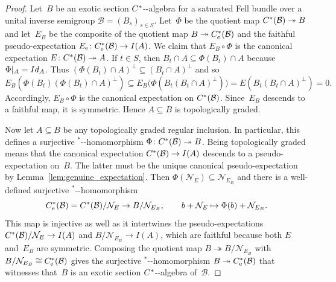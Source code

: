 \documentclass[10pt,a4paper]{amsart}
\providecommand{\nobreakdash}{\nobreak\hbox{-}}
\newcommand*{\B}{\mathcal B}%
\newcommand*{\Cst}{\textup C^*}%
\newcommand*{\Id}{\textup{Id}}%
\newcommand*{\Null}{\mathcal N}%
\newcommand*{\Star}{\(^*\)\nobreakdash-}
\newcommand*{\ess}{\mathrm{e}}%
\newcommand*{\nb}{\nobreakdash}
\newcommand*{\onto}{\twoheadrightarrow}
\begin{document}
\begin{proof}
  Let~\(B\) be an exotic section \(\Cst\)\nb-algebra for a saturated
  Fell bundle over a unital inverse semigroup \(\B=(B_{s})_{s\in S}\).
  Let~\(\Phi\) be the quotient map \(\Cst(\B) \onto B\) and
  let~\(E_B\) be the composite of the quotient map \(B\onto
  \Cst_\ess(\B)\) and the faithful pseudo-expectation \(E_\ess\colon
  \Cst_\ess(\B)\to I(A)\).
  We claim that \(E_B\circ \Phi\) is the canonical expectation
  \(E\colon \Cst(\B)\onto A\).
  If \(t\in S\), then \(B_t\cap A\subseteq \Phi(B_t)\cap A\) because
  \(\Phi|_A=\Id_A\).
  Thus \((\Phi(B_t)\cap A)^\bot \subseteq (B_t\cap A)^\bot\) and so
  \[
    E_B(\Phi(B_t)(\Phi(B_t)\cap A)^\bot)
    \subseteq E_B\bigl(\Phi(B_t(B_t\cap A)^\bot)\bigr)
    = E(B_t(B_t\cap A)^\bot)=0.
  \]
  Accordingly, \(E_B\circ\Phi\) is the canonical expectation on
  \(\Cst(\B)\).
  Since~\(E_B\) descends to a faithful map, it is symmetric.
  Hence \(A\subseteq B\) is topologically graded.

  Now let \(A\subseteq B\) be any topologically graded regular
  inclusion.
  In particular, this defines a surjective \Star{}homomorphism
  \(\Phi\colon\Cst(\B) \onto B\).
  Being topologically graded means that the canonical expectation
  \(\Cst(\B)\to I(A)\) descends to a pseudo-expectation on~\(B\).
  The latter must be the unique canonical pseudo-expectation by
  Lemma~\ref{lem:genuine_expectation}.
  Then \(\Phi(\Null_E)\subseteq \Null_{E_B}\) and there is a
  well-defined surjective \Star{}homomorphism
  \[
    \Cst_\ess(\B)= \Cst(\B)/\Null_E \to B/\Null_{E_B},
    \qquad
    b+\Null_E\mapsto \Phi(b)+\Null_{E_B}.
  \]
  This map is injective as well as it intertwines the
  pseudo-expectations \(\Cst(\B)/\Null_E\to I(A)\) and
  \(B/\Null_{E_B}\to I(A)\), which are faithful because both  \(E\)
  and~\(E_B\) are symmetric.
  Composing the quotient map \(B\onto B/\Null_{E_B}\) with
  \(B/\Null_{E_B}\cong \Cst_\ess(\B)\) gives the surjective
  \Star{}homomorphism \(B\onto \Cst_\ess(\B)\) that witnesses
  that~\(B\) is an exotic section \(\Cst\)\nb-algebra of~\(\B\).
\end{proof}
\end{document}
